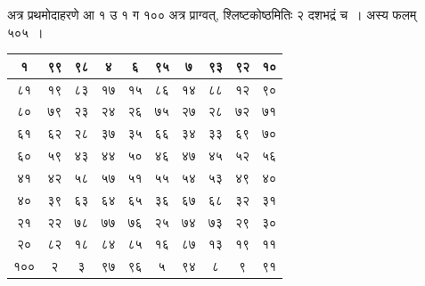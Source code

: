 \documentclass[11pt, openany]{book}
\begin{document}
अत्र प्रथमोदाहरणे आ १ उ १ ग १०० अत्र प्राग्वत्, श्लिष्टकोष्ठमितिः २ दशभद्रं च~। अस्य फलम् ५०५~।
\begin{table}[h]
	\centering
	\setlength{\extrarowheight}{2pt} \setlength{\tabcolsep}{2pt}
	\begin{tabular}{|c|c|c|c|c|c|c|c|c|c|}
		\hline
		१	& ९९ & ९८ & ४ & ६ & ९५ & ७ & ९३ & ९२ & १०\\
		\hline
		८१ & १९ & ८३ & १७ & १५ & ८६ & १४ & ८८ & १२ & ९० \\
		\hline
		८० & ७९ & २३ & २४ & २६ & ७५ & २७ & २८ & ७२ & ७१\\
		\hline
		६१ & ६२ & २८ & ३७ & ३५ & ६६ & ३४ & ३३ & ६९ & ७०\\
		\hline
		६० & ५९ & ४३ & ४४ & ५० & ४६ & ४७ & ४५ & ५२ & ५६ \\
		\hline
		४१ & ४२ & ५८ & ५७ & ५१ & ५५ & ५४ & ५३ & ४९ & ४०\\
		\hline
		४० & ३९ & ६३ & ६४ & ६५ & ३६ & ६७ & ६८ & ३२ & ३१\\
			\hline
		२१ & २२ & ७८ & ७७ & ७६ & २५ & ७४ & ७३ & २९ & ३० \\
			\hline
		२० & ८२ & १८ & ८४ & ८५ & १६ & ८७ & १३ & १९ & ११\\
			\hline
		१०० & २ & ३ &  ९७ & ९६ & ५ & ९४ & ८& ९ & ९१\\
			\hline
	\end{tabular}\qquad
\end{table}

\newpage

	
\end{document}
